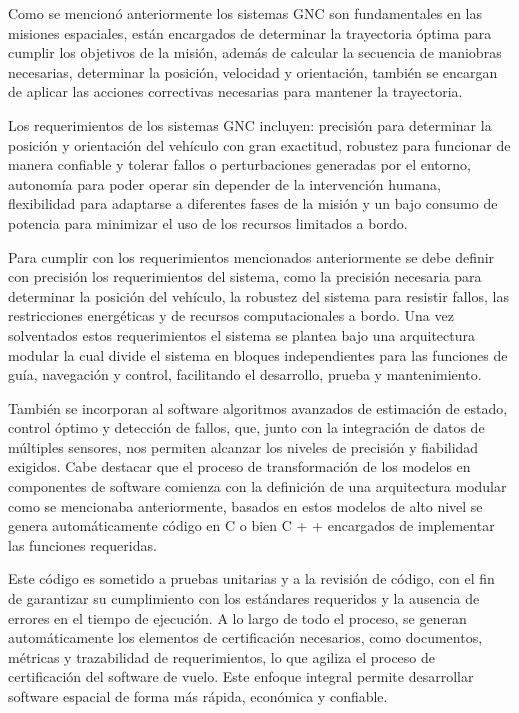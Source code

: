 \documentclass[12pt]{article}
\begin{document}
Como se mencionó anteriormente los sistemas GNC son fundamentales en las misiones espaciales, están encargados de determinar la trayectoria óptima para cumplir los objetivos de la misión, además de calcular la secuencia de maniobras necesarias, determinar la posición, velocidad y orientación, también se encargan de aplicar las acciones correctivas necesarias para mantener la trayectoria.

Los requerimientos de los sistemas GNC incluyen: precisión para determinar la posición y orientación del vehículo con gran exactitud, robustez para funcionar de manera confiable y tolerar fallos o perturbaciones generadas por el entorno, autonomía para poder operar sin depender de la intervención humana, flexibilidad para adaptarse a diferentes fases de la misión y un bajo consumo de potencia para minimizar el uso de los recursos limitados a bordo. 

Para cumplir con los requerimientos mencionados anteriormente se debe definir con precisión los requerimientos del sistema, como la precisión necesaria para determinar la posición del vehículo, la robustez del sistema para resistir fallos, las restricciones energéticas y de recursos computacionales a bordo. Una vez solventados estos requerimientos el sistema se plantea bajo una arquitectura modular la cual divide el sistema en bloques independientes para las funciones de guía, navegación y control, facilitando el desarrollo, prueba y mantenimiento. 

También se incorporan al software algoritmos avanzados de estimación de estado, control óptimo y detección de fallos, que, junto con la integración de datos de múltiples sensores, nos permiten alcanzar los niveles de precisión y fiabilidad exigidos. Cabe destacar que el proceso de transformación de los modelos en componentes de software comienza con la definición de una arquitectura modular como se mencionaba anteriormente, basados en estos modelos de alto nivel se genera automáticamente código en C o bien C + + encargados de implementar las funciones requeridas. 

Este código es sometido a pruebas unitarias y a la revisión de código, con el fin de garantizar su cumplimiento con los estándares requeridos y la ausencia de errores en el tiempo de ejecución. A lo largo de todo el proceso, se generan automáticamente los elementos de certificación necesarios, como documentos, métricas y trazabilidad de requerimientos, lo que agiliza el proceso de certificación del software de vuelo. Este enfoque integral permite desarrollar software espacial de forma más rápida, económica y confiable.
\end{document}
